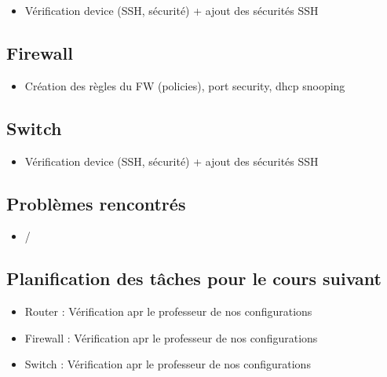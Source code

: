 \documentclass{article}
\begin{document}
\begin{itemize}

\item Vérification device (SSH, sécurité) + ajout des sécurités SSH
\end{itemize} 

\subsection{Firewall}

\begin{itemize}

\item Création des règles du FW (policies), port security, dhcp snooping

\end{itemize} 
\subsection{Switch}

\begin{itemize}

\item Vérification device (SSH, sécurité) + ajout des sécurités SSH
\end{itemize} 
\subsection{Problèmes rencontrés}
\begin{itemize}

\item /
\end{itemize} 
\subsection{Planification des tâches pour le cours suivant}
\begin{itemize}

\item Router : Vérification apr le professeur de nos configurations
\item Firewall : Vérification apr le professeur de nos configurations
\item Switch : Vérification apr le professeur de nos configurations


\end{itemize} 
\end{document}
